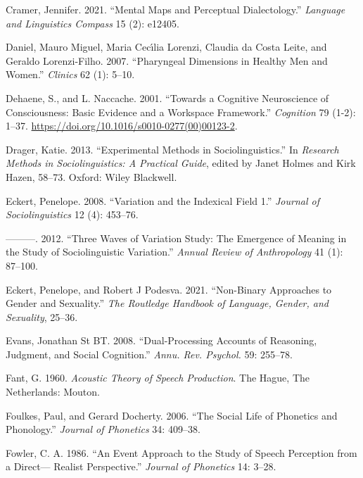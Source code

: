 \documentclass[
  letterpaper,
  DIV=11,
  numbers=noendperiod]{scrartcl}
\newlength{\cslhangindent}
\newenvironment{CSLReferences}[2] %
 {\begin{list}{}{%
  \setlength{\itemindent}{0pt}
  \setlength{\leftmargin}{0pt}
  \setlength{\parsep}{0pt}
  \ifodd #1
   \setlength{\leftmargin}{\cslhangindent}
   \setlength{\itemindent}{-1\cslhangindent}
  \fi
  \setlength{\itemsep}{#2\baselineskip}}}
 {\end{list}}
\begin{document}
\begin{CSLReferences}{1}{0}
Cramer, Jennifer. 2021. {``Mental Maps and Perceptual Dialectology.''}
\emph{Language and Linguistics Compass} 15 (2): e12405.

Daniel, Mauro Miguel, Maria Cecı́lia Lorenzi, Claudia da Costa Leite, and
Geraldo Lorenzi-Filho. 2007. {``Pharyngeal Dimensions in Healthy Men and
Women.''} \emph{Clinics} 62 (1): 5--10.

Dehaene, S., and L. Naccache. 2001. {``Towards a Cognitive Neuroscience
of Consciousness: Basic Evidence and a Workspace Framework.''}
\emph{Cognition} 79 (1-2): 1--37.
\url{https://doi.org/10.1016/s0010-0277(00)00123-2}.

Drager, Katie. 2013. {``Experimental Methods in Sociolinguistics.''} In
\emph{Research Methods in Sociolinguistics: A Practical Guide}, edited
by Janet Holmes and Kirk Hazen, 58--73. Oxford: Wiley Blackwell.

Eckert, Penelope. 2008. {``Variation and the Indexical Field 1.''}
\emph{Journal of Sociolinguistics} 12 (4): 453--76.

---------. 2012. {``Three Waves of Variation Study: {The} Emergence of
Meaning in the Study of Sociolinguistic Variation.''} \emph{Annual
Review of Anthropology} 41 (1): 87--100.

Eckert, Penelope, and Robert J Podesva. 2021. {``Non-Binary Approaches
to Gender and Sexuality.''} \emph{The Routledge Handbook of Language,
Gender, and Sexuality}, 25--36.

Evans, Jonathan St BT. 2008. {``Dual-Processing Accounts of Reasoning,
Judgment, and Social Cognition.''} \emph{Annu. Rev. Psychol.} 59:
255--78.

Fant, G. 1960. \emph{Acoustic Theory of Speech Production}. The Hague,
The Netherlands: Mouton.

Foulkes, Paul, and Gerard Docherty. 2006. {``The Social Life of
Phonetics and Phonology.''} \emph{Journal of Phonetics} 34: 409--38.

Fowler, C. A. 1986. {``An Event Approach to the Study of Speech
Perception from a Direct--- Realist Perspective.''} \emph{Journal of
Phonetics} 14: 3--28.


\end{CSLReferences}
\end{document}
